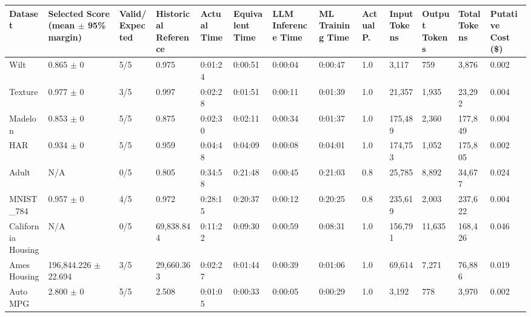 \begin{tabular}{lllllllllllll}
\hline
Dataset & Selected Score (mean \ensuremath{\pm} 95\% margin) & Valid/Expected & Historical Reference & Actual Time & Equivalent Time & LLM Inference Time & ML Training Time & Actual P. & Input Tokens & Output Tokens & Total Tokens & Putative Cost (\$) \\
\hline
Wilt & 0.865 \ensuremath{\pm} 0 & 5/5 & 0.975 & 0:01:24 & 0:00:51 & 0:00:04 & 0:00:47 & 1.0 & 3,117 & 759 & 3,876 & 0.002 \\
Texture & 0.977 \ensuremath{\pm} 0 & 3/5 & 0.997 & 0:02:28 & 0:01:51 & 0:00:11 & 0:01:39 & 1.0 & 21,357 & 1,935 & 23,292 & 0.004 \\
Madelon & 0.853 \ensuremath{\pm} 0 & 5/5 & 0.875 & 0:02:30 & 0:02:11 & 0:00:34 & 0:01:37 & 1.0 & 175,489 & 2,360 & 177,849 & 0.004 \\
HAR & 0.934 \ensuremath{\pm} 0 & 5/5 & 0.959 & 0:04:48 & 0:04:09 & 0:00:08 & 0:04:01 & 1.0 & 174,753 & 1,052 & 175,805 & 0.002 \\
Adult & N/A & 0/5 & 0.805 & 0:34:58 & 0:21:48 & 0:00:45 & 0:21:03 & 0.8 & 25,785 & 8,892 & 34,677 & 0.024 \\
MNIST\_784 & 0.957 \ensuremath{\pm} 0 & 4/5 & 0.972 & 0:28:15 & 0:20:37 & 0:00:12 & 0:20:25 & 0.8 & 235,619 & 2,003 & 237,622 & 0.004 \\
California Housing & N/A & 0/5 & 69,838.844 & 0:11:22 & 0:09:30 & 0:00:59 & 0:08:31 & 1.0 & 156,791 & 11,635 & 168,426 & 0.046 \\
Ames Housing & 196,844.226 \ensuremath{\pm} 22.694 & 3/5 & 29,660.363 & 0:02:27 & 0:01:44 & 0:00:39 & 0:01:06 & 1.0 & 69,614 & 7,271 & 76,886 & 0.019 \\
Auto MPG & 2.800 \ensuremath{\pm} 0 & 5/5 & 2.508 & 0:01:05 & 0:00:33 & 0:00:05 & 0:00:29 & 1.0 & 3,192 & 778 & 3,970 & 0.002 \\
\hline
\end{tabular}
